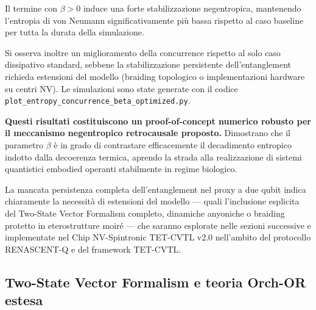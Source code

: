 \documentclass[11pt,a4paper]{article}
\theoremstyle{plain}
\theoremstyle{definition}
\begin{document}
\clearpage

Il termine con $\beta>0$ induce una forte stabilizzazione negentropica, mantenendo l'entropia di von Neumann significativamente più bassa rispetto al caso baseline per tutta la durata della simulazione. 

\vspace{0.2cm}



Si osserva inoltre un miglioramento della concurrence rispetto al solo caso dissipativo standard, sebbene la stabilizzazione persistente dell'entanglement richieda estensioni del modello (braiding topologico o implementazioni hardware su centri NV). 
Le simulazioni sono state generate con il codice \texttt{plot\_entropy\_concurrence\_beta\_optimized.py}.


\vspace{0.7cm}



\textbf{Questi risultati costituiscono un proof-of-concept numerico robusto per il meccanismo negentropico retrocausale proposto.} Dimostrano che il parametro $\beta$ è in grado di contrastare efficacemente il decadimento entropico indotto dalla decoerenza termica, aprendo la strada alla realizzazione di sistemi quantistici embodied operanti stabilmente in regime biologico. 


\vspace{0.3cm}


La mancata persistenza completa dell'entanglement nel proxy a due qubit indica chiaramente la necessità di estensioni del modello — quali l’inclusione esplicita del Two-State Vector Formalism completo, dinamiche anyoniche o braiding protetto in eterostrutture moiré — che saranno esplorate nelle sezioni successive e implementate nel Chip NV-Spintronic TET-CVTL v2.0 nell’ambito del protocollo RENASCENT-Q e del framework TET-CVTL.








\vspace{0.6cm}








\subsection{Two-State Vector Formalism e teoria Orch-OR estesa}
\label{sec:tsvf_orch_or}
\end{document}
